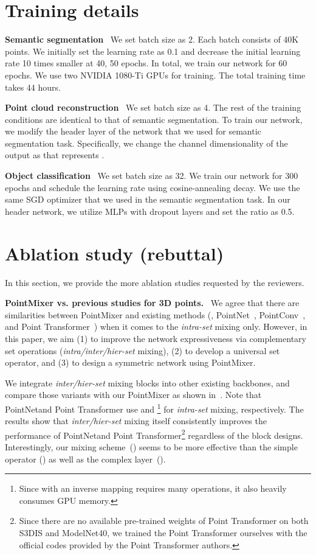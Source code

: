 \section{Training details}
\label{sec:Training details}
\noindent \textbf{Semantic segmentation} \
We set batch size as 2. Each batch consists of 40K points. We initially set the learning rate as 0.1 and decrease the initial learning rate 10 times smaller at 40, 50 epochs. In total, we train our network for 60 epochs. We use two NVIDIA 1080-Ti GPUs for training. The total training time takes 44 hours. 

\noindent \textbf{Point cloud reconstruction} \
We set batch size as 4. The rest of the training conditions are identical to that of semantic segmentation. To train our network, we modify the header layer of the network that we used for semantic segmentation task. Specifically, we change the channel dimensionality of the output as  that represents .

\noindent \textbf{Object classification} \
We set batch size as 32. We train our network for 300 epochs and schedule the learning rate using cosine-annealing decay. We use the same SGD optimizer that we used in the semantic segmentation task. In our header network, we utilize MLPs with dropout layers and set the ratio as 0.5. 
\section{Ablation study (rebuttal)}
In this section, we provide the more ablation studies requested by the reviewers. 

\noindent \textbf{PointMixer vs. previous studies for 3D points.} \
We agree that there are similarities between PointMixer and existing methods (\eg, PointNet\plusplus~\cite{pointnet++}, PointConv~\cite{wu2019pointconv}, and Point Transformer~\cite{point-transformer}) when it comes to the \textit{intra-set} mixing only.
However, in this paper, we aim (1) to improve the network expressiveness via complementary set operations (\textit{intra/inter/hier-set} mixing), 
(2) to develop a universal set operator, and (3) to design a symmetric network using PointMixer.


We integrate \textit{inter/hier-set} mixing blocks into other existing backbones, and compare those variants with our PointMixer as shown in~.
Note that PointNet\plusplus and Point Transformer use  and \footnote{Since  with an inverse mapping requires many  operations, it also heavily consumes GPU memory.} for \textit{intra-set} mixing, respectively.
The results show that \textit{inter/hier-set} mixing itself consistently improves the performance of PointNet\plusplus and Point Transformer\footnote{Since there are no available pre-trained weights of Point Transformer on both S3DIS and ModelNet40, we trained the Point Transformer ourselves with the official codes provided by the Point Transformer authors.} regardless of the block designs. Interestingly, our mixing scheme~() seems to be more effective than the simple operator () as well as the complex  layer~().




